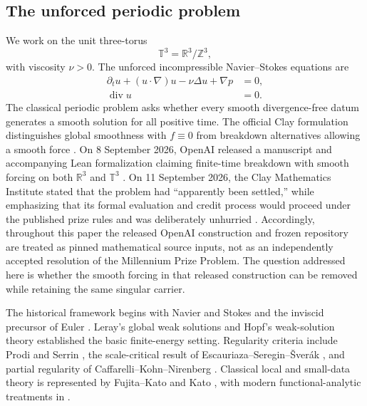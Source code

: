 \documentclass[11pt]{article}
\numberwithin{equation}{section}
\newcommand{\T}{\mathbb T^3}
\newcommand{\R}{\mathbb R}
\newcommand{\diver}{\operatorname{div}}
\begin{document}
\subsection{The unforced periodic problem}
We work on the unit three-torus
\[
\T=\R^3/\mathbb Z^3,
\]
with viscosity \(\nu>0\).  The unforced incompressible Navier--Stokes equations are
\begin{align}
\partial_tu+(u\cdot\nabla)u-\nu\Delta u+\nabla p&=0,\label{eq:NS}\\
\diver u&=0.\label{eq:div}
\end{align}
The classical periodic problem asks whether every smooth divergence-free datum generates a smooth solution for all positive time.  The official Clay formulation distinguishes global smoothness with \(f\equiv0\) from breakdown alternatives allowing a smooth force \cite{FeffermanClay}.  On 8 September 2026, OpenAI released a manuscript and accompanying Lean formalization claiming finite-time breakdown with smooth forcing on both \(\R^3\) and \(\T\) \cite{OpenAI2026NS,OpenAIRepo2026}.  On 11 September 2026, the Clay Mathematics Institute stated that the problem had ``apparently been settled,'' while emphasizing that its formal evaluation and credit process would proceed under the published prize rules and was deliberately unhurried \cite{ClayAnnouncement2026}.  Accordingly, throughout this paper the released OpenAI construction and frozen repository are treated as pinned mathematical source inputs, not as an independently accepted resolution of the Millennium Prize Problem.  The question addressed here is whether the smooth forcing in that released construction can be removed while retaining the same singular carrier.

The historical framework begins with Navier and Stokes \cite{Navier1827,Stokes1845} and the inviscid precursor of Euler \cite{Euler1757}.  Leray's global weak solutions \cite{Leray1934} and Hopf's weak-solution theory \cite{Hopf1951} established the basic finite-energy setting.  Regularity criteria include Prodi and Serrin \cite{Prodi1959,Serrin1962}, the scale-critical result of Escauriaza--Seregin--\v Sver\'ak \cite{EscauriazaSereginSverak2003}, and partial regularity of Caffarelli--Kohn--Nirenberg \cite{CKN1982}.  Classical local and small-data theory is represented by Fujita--Kato and Kato \cite{FujitaKato1964,Kato1984}, with modern functional-analytic treatments in \cite{Ladyzhenskaya1969,Temam1984,ConstantinFoias1988,Sohr2001,Galdi2011,RobinsonRodrigoSadowski2016}.
\end{document}
